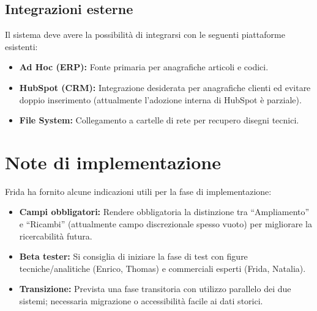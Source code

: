 \documentclass[12pt, a4paper]{article} %
\begin{document}
\subsection{Integrazioni esterne}
Il sistema deve avere la possibilità di integrarsi con le seguenti piattaforme
esistenti:
\begin{itemize}
      \item \textbf{Ad Hoc (ERP):} Fonte primaria per anagrafiche articoli e codici.
      \item \textbf{HubSpot (CRM):} Integrazione desiderata per anagrafiche clienti ed evitare doppio inserimento (attualmente l'adozione interna di HubSpot è parziale).
      \item \textbf{File System:} Collegamento a cartelle di rete per recupero disegni tecnici.
\end{itemize}

\section{Note di implementazione}
Frida ha fornito alcune indicazioni utili per la fase di implementazione:
\begin{itemize}
      \item \textbf{Campi obbligatori:} Rendere obbligatoria la distinzione tra ``Ampliamento'' e ``Ricambi'' (attualmente campo discrezionale spesso vuoto)
            per migliorare la ricercabilità futura.
      \item \textbf{Beta tester:} Si consiglia di iniziare la fase di test con figure tecniche/analitiche (Enrico, Thomas) e commerciali esperti (Frida, Natalia).
      \item \textbf{Transizione:} Prevista una fase transitoria con utilizzo parallelo dei due sistemi;
            necessaria migrazione o accessibilità facile ai dati storici.
\end{itemize}
\end{document}
